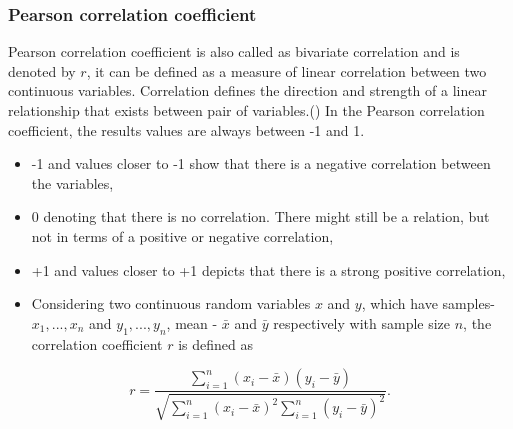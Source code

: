 \documentclass[12 pt]{scrartcl}
\begin{document}
	\subsubsection{Pearson correlation coefficient} 
	Pearson correlation coefficient is also called as bivariate correlation and is denoted by $r$, it can be defined as a measure of linear correlation between two continuous variables. Correlation defines the direction and strength of a linear relationship that exists between pair of variables.(\cite{Christ}) In the Pearson correlation coefficient, the results values are always between -1 and 1.
	\begin{itemize}
		\item -1 and values closer to -1 show that there is a negative correlation between the variables,
		\item 0 denoting that there is no correlation. There might still be a relation, but not in terms of a positive or negative correlation,
		\item +1 and values closer to +1 depicts that there is a strong positive correlation,
		\item Considering two continuous random variables $x$ and $y$, which have samples- $x_{1},...,x_{n} $ and $y_{1},...,y_{n} $, mean - $\bar{x}$ and $\bar{y}$ respectively with sample size $n$, the correlation coefficient $r$ is defined as
	\end{itemize}
	\begin{equation*}					           
		r=\frac{\sum_{i=1}^{n}\left(x_{i}-\bar{x}\right)\left(y_{i}-\bar{y}\right)}{\sqrt {\sum _{i=1}^{n}\left(x_{i}-\bar{x}\right)^{2} \sum _{i=1}^{n}\left(y_{i}-\bar{y}\right)^{2}}}.
	\end{equation*}
	
	
	
\end{document}
